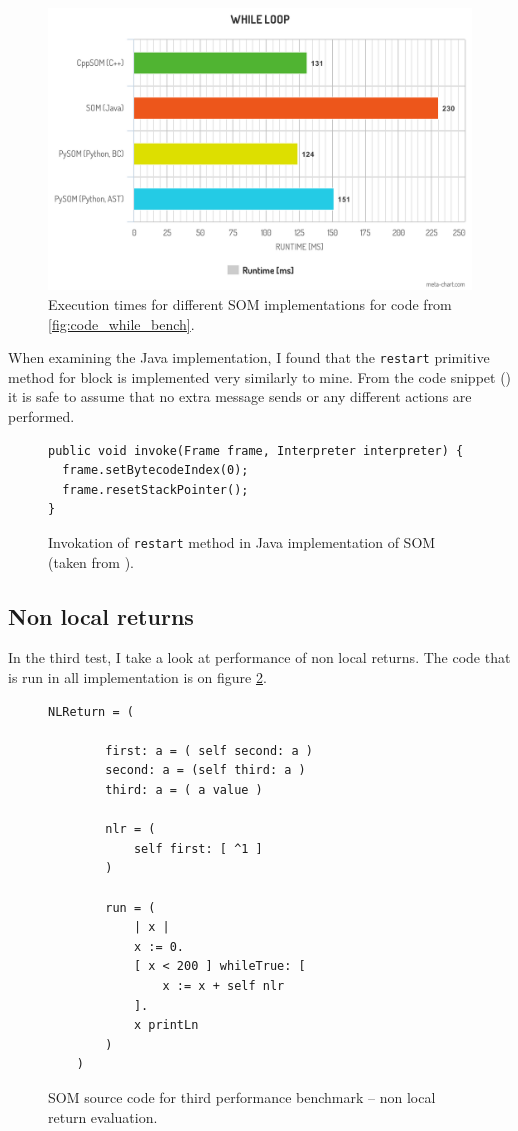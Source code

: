 \documentclass[thesis=M,english]{FITthesis}[2019/12/23]
\begin{document}
\begin{figure}[h!]
	\centering
	\includegraphics[width=\textwidth]{media/while_chart_1.png}
	\caption{Execution times for different SOM implementations for code from \ref{fig:code_while_bench}.}
	\label{fig:while_chart}
\end{figure}

When examining the Java implementation, I found that the \texttt{restart} primitive method for block is implemented very similarly to mine. From the code snippet () it is
safe to assume that no extra message sends or any different actions are performed.
\begin{figure}[h!]
	\centering
	\begin{verbatim}
public void invoke(Frame frame, Interpreter interpreter) {
  frame.setBytecodeIndex(0);
  frame.resetStackPointer();
}
	\end{verbatim}
	\caption{Invokation of \texttt{restart} method in Java implementation of SOM (taken from \cite{som-java-github}).}
\end{figure}

\subsection{Non local returns}
In the third test, I take a look at performance of non local returns. The code that is run in all implementation is on figure \ref{fig:code_nlret_bench}.
\begin{figure}[h!]
	\centering
	\begin{lstlisting}[language=Smalltalk]
	NLReturn = (

    	first: a = ( self second: a )
    	second: a = (self third: a )
    	third: a = ( a value )

    	nlr = (
        	self first: [ ^1 ]
    	)

    	run = (
        	| x |
        	x := 0.
        	[ x < 200 ] whileTrue: [
            	x := x + self nlr
        	].
        	x printLn
    	)
	)
	\end{lstlisting}
	\caption{SOM source code for third performance benchmark -- non local return evaluation.}
	\label{fig:code_nlret_bench}
\end{figure}
\end{document}
